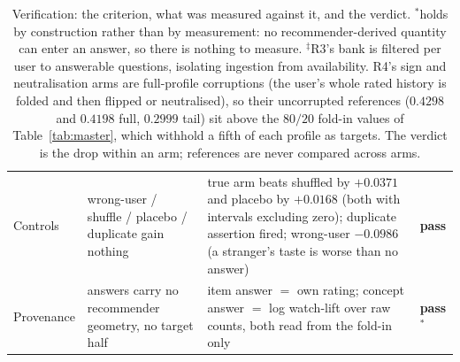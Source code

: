 \documentclass[manuscript,screen,review]{acmart}
\begin{document}
\begin{table}[t]
\begin{tabular}{p{1.7cm}p{3.7cm}p{6.0cm}p{1.2cm}}
\midrule
Controls & wrong-user / shuffle / placebo / duplicate gain nothing & true arm beats shuffled by $+0.0371$ and placebo by $+0.0168$ (both with intervals excluding zero); duplicate assertion fired; wrong-user $-0.0986$ (a stranger's taste is worse than no answer) & \textbf{pass} \\
Provenance & answers carry no recommender geometry, no target half & item answer $=$ own rating; concept answer $=$ log watch-lift over raw counts, both read from the fold-in only & \textbf{pass}$^{*}$ \\
\bottomrule
\end{tabular}
\caption{Verification: the criterion, what was measured against it, and the verdict. $^{*}$holds by construction rather than by measurement: no recommender-derived quantity can enter an answer, so there is nothing to measure. $^\ddagger$R3's bank is filtered per user to answerable questions, isolating ingestion from availability. R4's sign and neutralisation arms are full-profile corruptions (the user's whole rated history is folded and then flipped or neutralised), so their uncorrupted references ($0.4298$ and $0.4198$ full, $0.2999$ tail) sit above the $80/20$ fold-in values of Table~\ref{tab:master}, which withhold a fifth of each profile as targets. The verdict is the drop within an arm; references are never compared across arms.}
\label{tab:battery}
\end{table}
\end{document}
